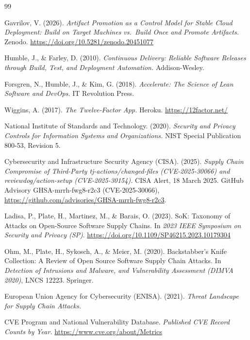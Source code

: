 \documentclass[11pt]{article}
\begin{document}
\begin{thebibliography}{99}
\footnotesize\setlength{\itemsep}{0.25em}

Gavrilov, V. (2026). \textit{Artifact Promotion as a Control Model for Stable Cloud Deployment: Build on Target Machines vs.\ Build Once and Promote Artifacts.} Zenodo. \url{https://doi.org/10.5281/zenodo.20451077}

Humble, J., \& Farley, D. (2010). \textit{Continuous Delivery: Reliable Software Releases through Build, Test, and Deployment Automation.} Addison-Wesley.

Forsgren, N., Humble, J., \& Kim, G. (2018). \textit{Accelerate: The Science of Lean Software and DevOps.} IT Revolution Press.

Wiggins, A. (2017). \textit{The Twelve-Factor App.} Heroku. \url{https://12factor.net/}

National Institute of Standards and Technology. (2020). \textit{Security and Privacy Controls for Information Systems and Organizations.} NIST Special Publication 800-53, Revision 5.

Cybersecurity and Infrastructure Security Agency (CISA). (2025). \textit{Supply Chain Compromise of Third-Party tj-actions/changed-files (CVE-2025-30066) and reviewdog/action-setup (CVE-2025-30154).} CISA Alert, 18 March 2025. GitHub Advisory GHSA-mrrh-fwg8-r2c3 (CVE-2025-30066), \url{https://github.com/advisories/GHSA-mrrh-fwg8-r2c3}.

Ladisa, P., Plate, H., Martinez, M., \& Barais, O. (2023). SoK: Taxonomy of Attacks on Open-Source Software Supply Chains. In \textit{2023 IEEE Symposium on Security and Privacy (SP)}. \url{https://doi.org/10.1109/SP46215.2023.10179304}

Ohm, M., Plate, H., Sykosch, A., \& Meier, M. (2020). Backstabber's Knife Collection: A Review of Open Source Software Supply Chain Attacks. In \textit{Detection of Intrusions and Malware, and Vulnerability Assessment (DIMVA 2020)}, LNCS 12223. Springer.

European Union Agency for Cybersecurity (ENISA). (2021). \textit{Threat Landscape for Supply Chain Attacks.}

CVE Program and National Vulnerability Database. \textit{Published CVE Record Counts by Year.} \url{https://www.cve.org/about/Metrics}


\end{thebibliography}
\end{document}
